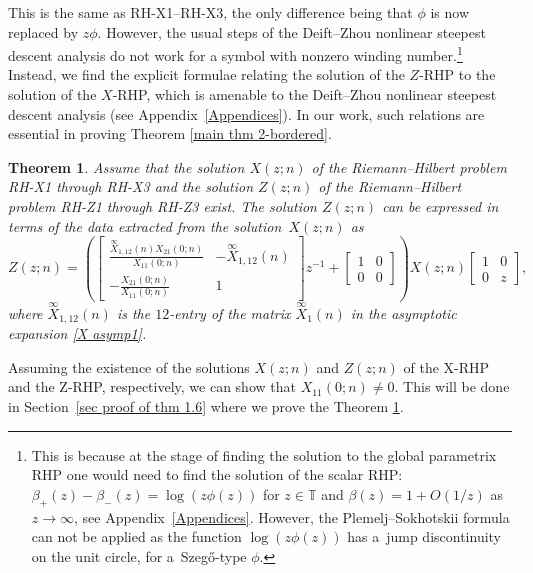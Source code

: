 \documentclass[pdftex]{sigma}
\numberwithin{equation}{section}
\newtheorem{Theorem}{Theorem}[section]
\newcommand{\T}{{\mathbb T}}
\newcommand{\be}{\beta}
\begin{document}
This is the same as RH-X1--RH-X3, the only difference being that $\phi$ is now replaced by $z\phi$. However, the usual steps of the Deift--Zhou nonlinear steepest descent analysis \cite{DZ} do not work for a symbol with nonzero winding number.\footnote{ This is because at the stage of finding the solution to the global parametrix RHP one would need to find the solution of the scalar RHP: $\be_+(z)-\be_-(z) = \log (z \phi(z))$ for $z \in \T$ and $\be(z)=1+O(1/z)$ as $z \to \infty$, see Appendix~\ref{Appendices}. However, the Plemelj--Sokhotskii formula can not be applied \cite{Gakhov} as the function $\log (z \phi(z))$ has a~jump discontinuity on the unit circle, for a~Szeg\H{o}-type $\phi$.} Instead, we find the explicit formulae relating the solution of the $Z$-RHP to the solution of the $X$-RHP, which is amenable to the Deift--Zhou nonlinear steepest descent analysis (see Appendix~\ref{Appendices}). In our work, such relations are essential in proving Theorem \ref{main thm 2-bordered}. 	
	
	\begin{Theorem}\label{thm Z-RHP intro}
Assume that the solution $X(z;n)$ of the Riemann--Hilbert problem {\rm RH-X1} through {\rm RH-X3} and the solution $Z(z;n)$ of the Riemann--Hilbert problem {\rm RH-Z1} through {\rm RH-Z3} exist. The solution $Z(z;n)$ can be expressed in terms of the data extracted from the solution~${X(z;n)}$ as
		\begin{equation}\label{ZX1}
			Z(z;n) = \left( \begin{bmatrix}
				 \tfrac{\overset{\infty}{X}_{1,12}(n)X_{21}(0;n)}{X_{11}(0;n)} & -\overset{\infty}{X}_{1,12}(n) \\[6pt]
					-\tfrac{X_{21}(0;n)}{X_{11}(0;n)} & 1
			\end{bmatrix} z^{-1} + \begin{bmatrix}
				1 & 0 \\
				0 & 0
			\end{bmatrix} \right) X(z;n) \begin{bmatrix}
				1 & 0 \\
				0 & z
			\end{bmatrix},
		\end{equation}
		where $\overset{\infty}{X}_{1,12}(n)$ is the $12$-entry of the matrix $\overset{\infty}{X}_{1}(n)$ in the asymptotic expansion \eqref{X asymp1}.
	\end{Theorem}
	
	\begin{Remark}
		Assuming the existence of the solutions $X(z;n)$ and $Z(z;n)$ of the X-RHP and the Z-RHP, respectively, we can show that $X_{11}(0;n) \neq 0$. This will be done in
		Section~\ref{sec proof of thm 1.6} where we prove the Theorem \ref{thm Z-RHP intro}.
	\end{Remark}
	
\end{document}

